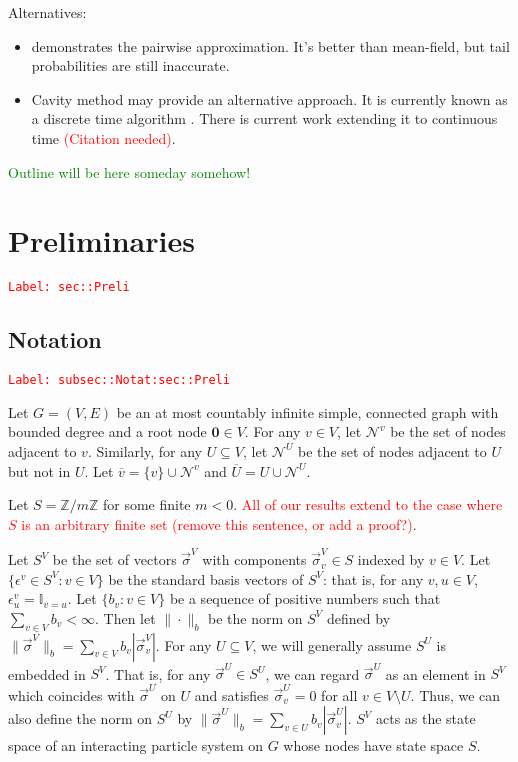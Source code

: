 \documentclass[12pt]{article}
\newcommand{\mb}{\mathbb}
\newcommand{\mc}{\mathcal}
\newcommand{\ov}{\overline}
\newcommand{\ep}{\epsilon}
\newcommand{\tr}{\textcolor{red}}
\newcommand{\tg}{\textcolor{green}}
\newcommand{\labe}[1]{\tr{\texttt{Label: #1}}}
\newcommand{\ind}{\hspace{24pt}}
\renewcommand{\root}{\mathbf{0}}				%
\renewcommand{\v}{v}							%
\newcommand{\vv}{u}								%
\renewcommand{\U}{U}							%
\renewcommand{\S}{S}							%
\newcommand{\s}{\sigma}							%
\newcommand{\sv}{\vec{\s}}						%
\renewcommand{\b}{b}							%
\newcommand{\ev}{\ep}							%
\newcommand{\neigh}{\mc{N}}						%
\newcommand{\vind}[1]{^{#1}}					%
\newcommand{\carp}[1]{^{#1}}					%
\newcommand{\vsi}[1]{^{#1}}						%
\newcommand{\cind}[1]{_{#1}}					%
\newcommand{\cl}{\ov}							%
\begin{document}
Alternatives:

\begin{itemize}
\item \cite{Gas15} demonstrates the pairwise approximation. It's better than mean-field, but tail probabilities are still inaccurate.

\item Cavity method may provide an alternative approach. It is currently known as a discrete time algorithm \cite{Lac15}\cite{KanMon11}. There is current work extending it to continuous time \tr{(Citation needed)}.
\end{itemize}

\tg{Outline will be here someday somehow!}


\section{Preliminaries}
\label{sec::Preli}\labe{sec::Preli}

\subsection{Notation}
\label{subsec::Notat:sec::Preli}\labe{subsec::Notat:sec::Preli}

Let \(G = (V,E)\) be an at most countably infinite simple, connected graph with bounded degree and a root node \(\root \in V\). For any \(\v \in V\), let \(\neigh\vind{\v}\) be the set of nodes adjacent to \(\v\). Similarly, for any \(\U \subseteq V\), let \(\neigh\vind{\U}\) be the set of nodes adjacent to \(\U\) but not in \(\U\). Let \(\cl{\v} = \{\v\}\cup\neigh\vind{\v}\) and \(\cl{\U} = \U\cup \neigh\vind{\U}\). 

\ind Let \(S = \mb{Z}/m\mb{Z}\) for some finite \(m < 0\). \tr{All of our results extend to the case where \(\S\) is an arbitrary finite set (remove this sentence, or add a proof?)}.

\ind Let \(\S\carp{V}\) be the set of vectors \(\sv\cind{}\vsi{V}\) with components \(\sv\cind{\v}\vsi{V} \in \S\) indexed by \(\v\in V\). Let \(\{\ev\vind{\v}\in\S\carp{V}: \v\in V\}\) be the standard basis vectors of \(\S\carp{V}\): that is, for any \(\v,\vv\in V\), \(\ev\vind{\v}\cind{\vv} = \mb{I}_{\v = \vv}\). Let \(\{\b\cind{\v}:\v\in V\}\) be a sequence of positive numbers such that \(\sum_{\v\in V} \b\cind{\v} < \infty\). Then let \(\|\cdot\|_{\b}\) be the norm on \(\S\carp{V}\) defined by \(\|\sv\cind{}\vsi{V}\|_{\b} = \sum_{\v\in V} \b\cind{\v}|\sv\cind{\v}\vsi{V}|\). For any \(\U\subseteq V\), we will generally assume \(\S\carp{\U}\) is embedded in \(\S\carp{V}\). That is, for any \(\sv\cind{}\vsi{\U}\in \S\carp{\U}\), we can regard \(\sv\vsi{\U}\) as an element in \(\S\carp{V}\) which coincides with \(\sv\vsi{\U}\) on \(\U\) and satisfies \(\sv\vsi{\U}\cind{\v} = 0\) for all \(\v\in V\setminus \U\). Thus, we can also define the norm on \(\S\carp{\U}\) by \(\|\sv\cind{}\vsi{\U}\|_{\b} = \sum_{\v\in\U} \b\cind{\v}|\sv\cind{\v}\vsi{\U}|\). \(\S\carp{V}\) acts as the state space of an interacting particle system on \(G\) whose nodes have state space \(\S\).
\end{document}

